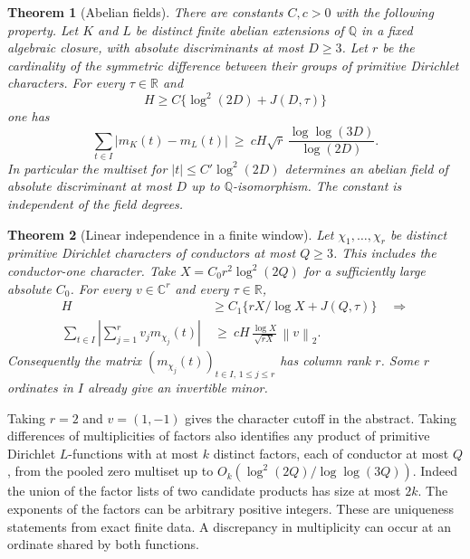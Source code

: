 \documentclass[11pt]{article}
\newtheorem{theorem}{Theorem}
\newcommand{\C}{\mathbb C}\newcommand{\Q}{\mathbb Q}\newcommand{\R}{\mathbb R}
\newcommand{\abs}[1]{\left|#1\right|}\newcommand{\norm}[1]{\left\|#1\right\|}
\begin{document}
\begin{theorem}[Abelian fields]\label{thm:fields}
There are constants $C,c>0$ with the following property. Let $K$ and $L$ be
distinct finite abelian extensions of $\Q$ in a fixed algebraic closure, with
absolute discriminants at most $D\ge3$. Let $r$ be the cardinality of the
symmetric difference between their groups of primitive Dirichlet characters.
For every $\tau\in\R$ and
\[
 H\ge C\{\log^2(2D)+J(D,\tau)\}
\]
one has
\begin{equation}\label{eq:fieldmain}
 \sum_{t\in I}|m_K(t)-m_L(t)|
 \ \ge\ c H\sqrt r\,\frac{\log\log(3D)}{\log(2D)} .
\end{equation}
In particular the multiset for $|t|\le C'\log^2(2D)$ determines an abelian
field of absolute discriminant at most $D$ up to $\Q$-isomorphism. The
constant is independent of the field degrees.
\end{theorem}

\begin{theorem}[Linear independence in a finite window]\label{thm:family}
Let $\chi_1,\ldots,\chi_r$ be distinct primitive Dirichlet characters
of conductors at most $Q\ge3$. This includes the conductor-one character.
Take $X=C_0r^2\log^2(2Q)$ for a sufficiently large absolute $C_0$. For
every $v\in\C^r$ and every $\tau\in\R$,
\begin{align}
 H&\ge C_1\{rX/\log X+J(Q,\tau)\}
 \quad\Longrightarrow\nonumber\\[-2pt]
 \sum_{t\in I}\abs{\sum_{j=1}^r v_jm_{\chi_j}(t)}
 &\ \ge\ c H\,\frac{\log X}{\sqrt{rX}}\,\norm{v}_2 .
 \label{eq:familymain}
\end{align}
Consequently the matrix $(m_{\chi_j}(t))_{t\in I,\,1\le j\le r}$ has
column rank $r$. Some $r$ ordinates in $I$ already give an invertible minor.
\end{theorem}

Taking $r=2$ and $v=(1,-1)$ gives the character cutoff in the abstract.
Taking differences of multiplicities of factors also identifies any product
of primitive Dirichlet $L$-functions with at most $k$ distinct factors,
each of conductor at most $Q$, from the pooled zero multiset up to
$O_k(\log^2(2Q)/\log\log(3Q))$. Indeed the union of the factor lists of
two candidate products has size at most $2k$. The exponents of the factors
can be arbitrary positive integers. These are uniqueness statements from
exact finite data. A discrepancy in multiplicity can occur at an ordinate
shared by both functions.
\end{document}
